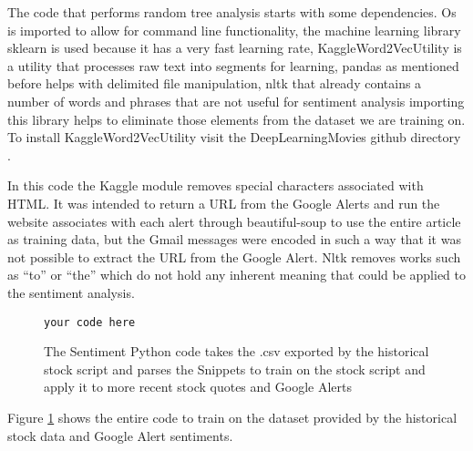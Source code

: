 \documentclass[sigconf]{acmart}
\begin{document}
The code that performs random tree analysis starts with some dependencies. Os is imported to allow for command line functionality, the machine learning library sklearn is used because it has a very fast learning rate, KaggleWord2VecUtility is a utility that processes raw text into segments for learning, pandas as mentioned before helps with delimited file manipulation, nltk that already contains a number of words and phrases that are not useful for sentiment analysis importing this library helps to eliminate those elements from the dataset we are training on. To install KaggleWord2VecUtility visit the DeepLearningMovies github directory \cite{kaggle}. 

In this code the Kaggle module removes special characters associated with HTML. It was intended to return a URL from the Google Alerts and run the website associates with each alert through beautiful-soup to use the entire article as training data, but the Gmail messages were encoded in such a way that it was not possible to extract the URL from the Google Alert. Nltk removes works such as ``to'' or ``the'' which do not hold any inherent meaning that could be applied to the sentiment analysis. 


\begin{figure}[htb]
\begin{verbatim}
your code here 
\end{verbatim}
\caption{The Sentiment Python code takes the .csv exported by the historical stock script and parses the Snippets to train on the stock script and apply it to more recent stock quotes and Google Alerts}\label{c:sentiment}
\end{figure}

Figure \ref{c:sentiment} shows the entire code to train on the dataset provided by the historical stock data and Google Alert sentiments.
\end{document}
